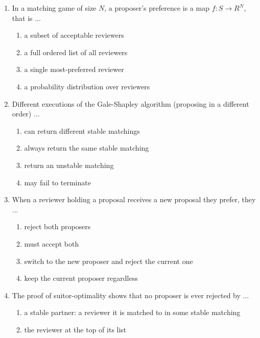 \documentclass[11pt]{article}
\begin{document}
\begin{enumerate}[itemsep=6pt]
  \begin{enumerate}
    \item contains a pair who would both abandon their partners for each other
    \item always gives everyone their last choice
    \item is impossible to compute
    \item uses more than two sets
  \end{enumerate}
  \item In a matching game of size \(N\), a proposer's preference is a map \(f: S \to R^N\), that is ...
  \begin{enumerate}
    \item a subset of acceptable reviewers
    \item a full ordered list of all reviewers
    \item a single most-preferred reviewer
    \item a probability distribution over reviewers
  \end{enumerate}
  \item Different executions of the Gale-Shapley algorithm (proposing in a different order) ...
  \begin{enumerate}
    \item can return different stable matchings
    \item always return the same stable matching
    \item return an unstable matching
    \item may fail to terminate
  \end{enumerate}
  \item When a reviewer holding a proposal receives a new proposal they prefer, they ...
  \begin{enumerate}
    \item reject both proposers
    \item must accept both
    \item switch to the new proposer and reject the current one
    \item keep the current proposer regardless
  \end{enumerate}
  \item The proof of suitor-optimality shows that no proposer is ever rejected by ...
  \begin{enumerate}
    \item a stable partner: a reviewer it is matched to in some stable matching
    \item the reviewer at the top of its list

\end{enumerate}
\end{enumerate}
\end{document}
